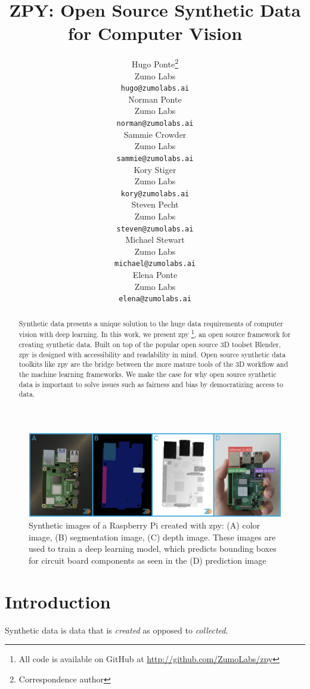\documentclass{article}
\title{ZPY: Open Source Synthetic Data for Computer Vision}
\author{
	{\hspace{1mm}Hugo Ponte}\footnote{Correspondence author} \\ 
	Zumo Labs \\
	\texttt{hugo@zumolabs.ai} \\
	\And
	{\hspace{1mm}Norman Ponte} \\
	Zumo Labs \\
	\texttt{norman@zumolabs.ai} \\
	\And
	{\hspace{1mm}Sammie Crowder} \\
	Zumo Labs \\
	\texttt{sammie@zumolabs.ai} \\
	\And
	{\hspace{1mm}Kory Stiger} \\
	Zumo Labs \\
	\texttt{kory@zumolabs.ai} \\
	\And
	{\hspace{1mm}Steven Pecht} \\
	Zumo Labs \\
	\texttt{steven@zumolabs.ai} \\
	\And
	{\hspace{1mm}Michael Stewart} \\
	Zumo Labs \\
	\texttt{michael@zumolabs.ai} \\
	\And
	{\hspace{1mm}Elena Ponte} \\
	Zumo Labs \\
	\texttt{elena@zumolabs.ai} \\
}
\date{}
\begin{document}
\maketitle

\begin{abstract}
Synthetic data presents a unique solution to the huge data requirements of computer vision with deep learning. In this work, we present zpy \footnote{All code is available on GitHub at \url{http://github.com/ZumoLabs/zpy}}, an open source framework for creating synthetic data. Built on top of the popular open source 3D toolset Blender, zpy is designed with accessibility and readability in mind. Open source synthetic data toolkits like zpy are the bridge between the more mature tools of the 3D workflow and the machine learning frameworks. We make the case for why open source synthetic data is important to solve issues such as fairness and bias by democratizing access to data.
\end{abstract}


\begin{figure}[!ht]
	\centering
	\includegraphics[width=\textwidth]{cover.png}
	\caption{Synthetic images of a Raspberry Pi created with zpy: (A) color image, (B) segmentation image, (C) depth image. These images are used to train a deep learning model, which predicts bounding boxes for circuit board components as seen in the (D) prediction image}
	\label{fig:fig1}
\end{figure}

\section{Introduction}
\label{sec:introduction}

Synthetic data is data that is \emph{created} as opposed to \emph{collected}.
\end{document}
